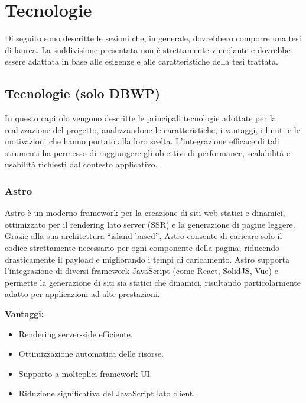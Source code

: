 \clearpage{\pagestyle{empty}\cleardoublepage}
\chapter{Tecnologie}
\label{chap:tecnologie}

Di seguito sono descritte le sezioni che, in generale, dovrebbero comporre una tesi di laurea. La suddivisione presentata non è strettamente vincolante e dovrebbe essere adattata in base alle esigenze e alle caratteristiche della tesi trattata.

\section{Tecnologie (solo DBWP)}

In questo capitolo vengono descritte le principali tecnologie adottate per la realizzazione del progetto, analizzandone le caratteristiche, i vantaggi, i limiti e le motivazioni che hanno portato alla loro scelta. L’integrazione efficace di tali strumenti ha permesso di raggiungere gli obiettivi di performance, scalabilità e usabilità richiesti dal contesto applicativo.

\subsection{Astro}

Astro è un moderno framework per la creazione di siti web statici e dinamici, ottimizzato per il rendering lato server (SSR) e la generazione di pagine leggere. Grazie alla sua architettura “island-based”, Astro consente di caricare solo il codice strettamente necessario per ogni componente della pagina, riducendo drasticamente il payload e migliorando i tempi di caricamento. Astro supporta l’integrazione di diversi framework JavaScript (come React, SolidJS, Vue) e permette la generazione di siti sia statici che dinamici, risultando particolarmente adatto per applicazioni ad alte prestazioni.

\textbf{Vantaggi:}
\begin{itemize}
    \item Rendering server-side efficiente.
    \item Ottimizzazione automatica delle risorse.
    \item Supporto a molteplici framework UI.
    \item Riduzione significativa del JavaScript lato client.
\end{itemize}

